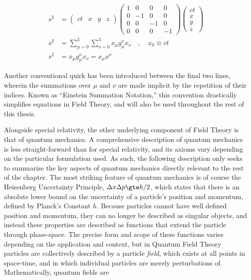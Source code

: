     \begin{equation} \begin{split}
        s^2 &= \begin{pmatrix} ct & x & y & z\end{pmatrix} 
            \begin{pmatrix}
                1 &  0 &  0 &  0 \\
                0 & -1 &  0 &  0 \\
                0 &  0 & -1 &  0 \\
                0 &  0 &  0 & -1
            \end{pmatrix}
            \begin{pmatrix} ct \\ x \\ y \\ z \end{pmatrix} \\
        s^2 &= \sum\limits_{\mu=0}^3 \sum\limits_{\nu=0}^3 x_\mu g_\mu^\nu x_\nu
            \quad , \quad x_0 \equiv ct \\
        s^2 &= x_\mu g_\mu^\nu x_\nu = x_\mu x^\nu
    \end{split} \end{equation}

    Another conventional quirk has been introduced between the final two lines,
        wherein the summations over $\mu$ and $\nu$ are made implicit by the repetition of their indices.
    Known as ``Einstein Summation Notation,'' this convention drastically simplifies equations in Field Theory,
        and will also be used throughout the rest of this thesis.

    Alongside special relativity, the other underlying component of Field Theory is that of quantum mechanics.
    A comprehensive description of quantum mechanics is less straight-forward than for special relativity,
        and its axioms vary depending on the particular formulation used.
    As such, the following description only seeks to summarize the key aspects of quantum mechanics
        directly relevant to the rest of the chapter.
    The most striking feature of quantum mechanics is of course the Heisenberg Uncertainty Principle,
        $\Delta x \Delta p \gte h/2$, which states that there is an absolute lower bound on the
        uncertainty of a particle's position and momentum, defined by Planck's Constant $h$.
    Because particles cannot have well defined position and momentum, they can no longer be described as singular objects,
        and instead these properties are described as functions that extend the particle through phase-space.
    The precise form and scope of these functions varies depending on the application and context,
        but in Quantum Field Theory particles are collectively described by a particle \textit{field},
        which exists at all points in space-time, and in which individual particles are merely perturbations of.
    Mathematically, quantum fields are 


